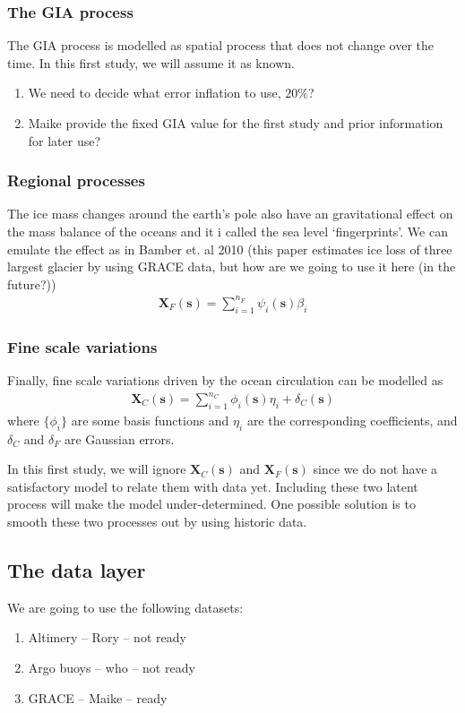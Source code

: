 \documentclass[cmbright,fleqn,referee]{envauth}
\newcommand{\bX}{\bm{X}}
\newcommand{\bs}{\bm{s}}
\begin{document}
\subsubsection{The GIA process}
The GIA process is modelled as spatial process that does not change over the time. In this first study, we will assume it as known. 
\begin{enumerate}
\item We need to decide what error inflation to use, $20\%$?
\item Maike provide the fixed GIA value for the first study and prior information for later use?
\end{enumerate}

\subsubsection{Regional processes}
The ice mass changes around the earth's pole also have an gravitational effect on the mass balance of the oceans and it i called the sea level `fingerprints'. We can emulate the effect as in Bamber et. al 2010 (this paper estimates ice loss of three largest glacier by using GRACE data, but how are we going to use it here (in the future?))
\begin{align}
\bX_{F}(\bs) = \sum_{i=1}^{n_F} \psi_i(\bs)\beta_i
\end{align}


\subsubsection{Fine scale variations}
Finally, fine scale variations driven by the ocean circulation can be modelled as 
\begin{align}
\bX_{C}(\bs) = \sum_{i=1}^{n_C} \phi_i(\bs)\eta_i + \delta_{C}(\bs)
\end{align}
where $\{\phi_i\}$ are some basis functions and $\eta_i$ are the corresponding coefficients, and $\delta_C$ and $\delta_F$ are Gaussian errors.

In this first study, we will ignore $\bX_C(\bs)$ and $\bX_F(\bs)$ since we do not have a satisfactory model to relate them with data yet. Including these two latent process will make the model under-determined. One possible solution is to smooth these two processes out by using historic data. 



\subsection{The data layer}
We are going to use the following datasets:
\begin{enumerate}
\item Altimery -- Rory -- not ready
\item Argo buoys -- who -- not ready
\item GRACE -- Maike -- ready
\end{enumerate}
\end{document}
